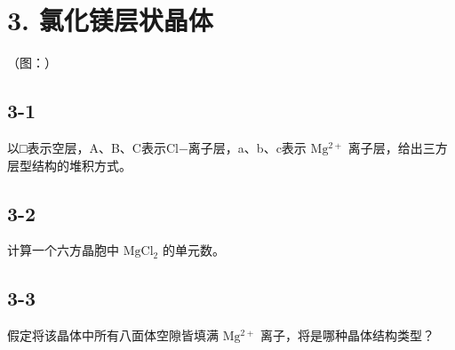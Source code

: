 \section*{3. 氯化镁层状晶体}
（图：）

\subsection*{3-1}
以□表⽰空层，A、B、C表⽰Cl−离⼦层，a、b、c表⽰ $\mathrm { M g ^ { 2 + } }$ 离⼦层，给出三⽅层型结构的堆积⽅式。

\subsection*{3-2}
计算⼀个六⽅晶胞中 $\mathrm { M g C l _ { 2 } }$ 的单元数。

\subsection*{3-3}
假定将该晶体中所有⼋⾯体空隙皆填满 $\mathrm { M g ^ { 2 + } }$ 离⼦，将是哪种晶体结构类型？
